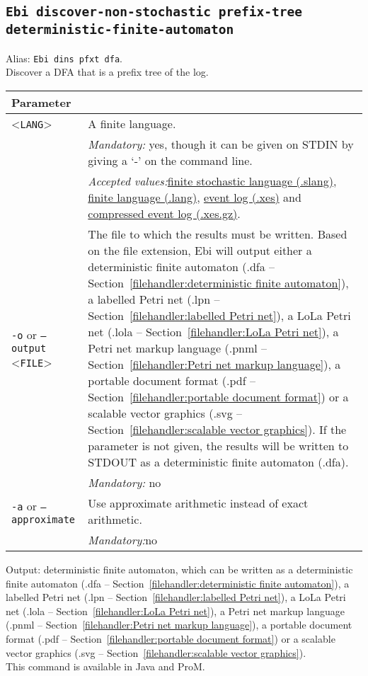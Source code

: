 {\subsection{\texttt{Ebi discover-non-stochastic prefix-tree deterministic-finite-automaton}}
\label{command:Ebi discover-non-stochastic prefix-tree deterministic-finite-automaton}
Alias: \texttt{Ebi dins pfxt dfa}.\\
Discover a DFA that is a prefix tree of the log.\\
\begin{tabularx}{\linewidth}{lX}
\toprule
Parameter \\\midrule
<\texttt{LANG}>&A finite language.\\
&\textit{Mandatory:} \quad yes, though it can be given on STDIN by giving a `-' on the command line.\\
&\textit{Accepted values:}\quad \hyperref[filehandler:finite stochastic language]{finite stochastic language (.slang)}, \hyperref[filehandler:finite language]{finite language (.lang)}, \hyperref[filehandler:event log]{event log (.xes)} and \hyperref[filehandler:compressed event log]{compressed event log (.xes.gz)}.\\
\texttt{-o} or \texttt{--output} <\texttt{FILE}> &
The file to which the results must be written. Based on the file extension, Ebi will output either a deterministic finite automaton (.dfa -- Section~\ref{filehandler:deterministic finite automaton}), a labelled Petri net (.lpn -- Section~\ref{filehandler:labelled Petri net}), a LoLa Petri net (.lola -- Section~\ref{filehandler:LoLa Petri net}), a Petri net markup language (.pnml -- Section~\ref{filehandler:Petri net markup language}), a portable document format (.pdf -- Section~\ref{filehandler:portable document format}) or a scalable vector graphics (.svg -- Section~\ref{filehandler:scalable vector graphics}).
If the parameter is not given, the results will be written to STDOUT as a deterministic finite automaton (.dfa).\\
&\textit{Mandatory:} \quad no\\
\texttt{-a} or \texttt{--approximate} & Use approximate arithmetic instead of exact arithmetic.\\
&\textit{Mandatory:}\quad no\\
\bottomrule
\end{tabularx}
\noindent Output: deterministic finite automaton, which can be written as a deterministic finite automaton (.dfa -- Section~\ref{filehandler:deterministic finite automaton}), a labelled Petri net (.lpn -- Section~\ref{filehandler:labelled Petri net}), a LoLa Petri net (.lola -- Section~\ref{filehandler:LoLa Petri net}), a Petri net markup language (.pnml -- Section~\ref{filehandler:Petri net markup language}), a portable document format (.pdf -- Section~\ref{filehandler:portable document format}) or a scalable vector graphics (.svg -- Section~\ref{filehandler:scalable vector graphics}).
\\This command is available in Java and ProM.
}
